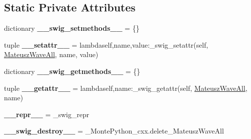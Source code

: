 \subsection*{Static Private Attributes}
\begin{DoxyCompactItemize}
\item 
\hypertarget{classMontePython__cxx_1_1MateuszWaveAll_adc609b72dbc80dae9da395a8c2180984}{}dictionary {\bfseries \+\_\+\+\_\+swig\+\_\+setmethods\+\_\+\+\_\+} = \{\}\label{classMontePython__cxx_1_1MateuszWaveAll_adc609b72dbc80dae9da395a8c2180984}

\item 
\hypertarget{classMontePython__cxx_1_1MateuszWaveAll_a9ac26548d771bd5a5b5aefd7975ae6a6}{}tuple {\bfseries \+\_\+\+\_\+setattr\+\_\+\+\_\+} = lambdaself,name,value\+:\+\_\+swig\+\_\+setattr(self, \hyperlink{classMontePython__cxx_1_1MateuszWaveAll}{Mateusz\+Wave\+All}, name, value)\label{classMontePython__cxx_1_1MateuszWaveAll_a9ac26548d771bd5a5b5aefd7975ae6a6}

\item 
\hypertarget{classMontePython__cxx_1_1MateuszWaveAll_a4bdc11af26ab9773ca56e0394e67545f}{}dictionary {\bfseries \+\_\+\+\_\+swig\+\_\+getmethods\+\_\+\+\_\+} = \{\}\label{classMontePython__cxx_1_1MateuszWaveAll_a4bdc11af26ab9773ca56e0394e67545f}

\item 
\hypertarget{classMontePython__cxx_1_1MateuszWaveAll_a6912f6b46f84052d2da6c469ae288e89}{}tuple {\bfseries \+\_\+\+\_\+getattr\+\_\+\+\_\+} = lambdaself,name\+:\+\_\+swig\+\_\+getattr(self, \hyperlink{classMontePython__cxx_1_1MateuszWaveAll}{Mateusz\+Wave\+All}, name)\label{classMontePython__cxx_1_1MateuszWaveAll_a6912f6b46f84052d2da6c469ae288e89}

\item 
\hypertarget{classMontePython__cxx_1_1MateuszWaveAll_a6cb7ff013059c41c305ab931853e15e1}{}{\bfseries \+\_\+\+\_\+repr\+\_\+\+\_\+} = \+\_\+swig\+\_\+repr\label{classMontePython__cxx_1_1MateuszWaveAll_a6cb7ff013059c41c305ab931853e15e1}

\item 
\hypertarget{classMontePython__cxx_1_1MateuszWaveAll_a387eb3f8ff16a8f0309f2327eaed6e38}{}{\bfseries \+\_\+\+\_\+swig\+\_\+destroy\+\_\+\+\_\+} = \+\_\+\+Monte\+Python\+\_\+cxx.\+delete\+\_\+\+Mateusz\+Wave\+All\label{classMontePython__cxx_1_1MateuszWaveAll_a387eb3f8ff16a8f0309f2327eaed6e38}

\end{DoxyCompactItemize}



